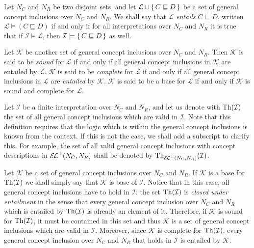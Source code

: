 \begin{Definition}
  \label{def:entailment-of-gcis}
  Let $N_C$ and $N_R$ be two disjoint sets, and let $\mathcal{L} \cup {\ensuremath{\{\, C \sqsubseteq
    D \,\}}}$ be a set of general concept inclusions over $N_C$ and $N_R$.  We shall say that
  $\mathcal{L}$ \emph{entails} $C \sqsubseteq D$, written $\mathcal{L} \models (C
  \sqsubseteq D)$ if and only if for all interpretations over $N_C$ and $N_R$ it is true
  that if $\mathcal{I} \models \mathcal{L}$, then $\mathcal{I} \models {\ensuremath{\{\, C \sqsubseteq
    D \,\}}}$ as well.

  Let $\mathcal{K}$ be another set of general concept inclusions over $N_C$ and $N_R$.
  Then $\mathcal{K}$ is said to be \emph{sound} for $\mathcal{L}$ if and only if all
  general concept inclusions in $\mathcal{K}$ are entailed by $\mathcal{L}$.
  $\mathcal{K}$ is said to be \emph{complete} for $\mathcal{L}$ if and only if all general
  concept inclusions in $\mathcal{L}$ are \emph{entailed} by $\mathcal{K}$.  $\mathcal{K}$
  is said to be a base for $\mathcal{L}$ if and only if $\mathcal{K}$ is sound and
  complete for $\mathcal{L}$.
\end{Definition}

Let $\mathcal{I}$ be a finite interpretation over $N_C$ and $N_R$, and let us denote with
$\operatorname{Th}(\mathcal{I})$ the set of all general concept inclusions which are valid in
$\mathcal{I}$.  Note that this definition requires that the logic which is within the
general concept inclusions is known from the context.  If this is not the case, we shall
add a subscript to clarify this.  For example, the set of all valid general concept
inclusions with concept descriptions in ${{\mathcal{E}\kern-.3ex\mathcal{L}}^\bot}(N_C, N_R)$ shall be denoted by
$\operatorname{Th}_{{{\mathcal{E}\kern-.3ex\mathcal{L}}^\bot}(N_C, N_R)}(\mathcal{I})$.

Let $\mathcal{K}$ be a set of general concept inclusions over $N_C$ and $N_R$.  If
$\mathcal{K}$ is a base for $\operatorname{Th}(\mathcal{I})$ we shall simply say that $\mathcal{K}$ is
base of $\mathcal{I}$.  Notice that in this case, all general concept inclusions have to
hold in $\mathcal{I}$: the set $\operatorname{Th}(\mathcal{I})$ is \emph{closed under entailment} in the
sense that every general concept inclusion over $N_C$ and $N_R$ which is entailed by
$\operatorname{Th}(\mathcal{I})$ is already an element of it.  Therefore, if $\mathcal{K}$ is sound for
$\operatorname{Th}(\mathcal{I})$, it must be contained in this set and thus $\mathcal{K}$ is a set of
general concept inclusions which are valid in $\mathcal{I}$.  Moreover, since
$\mathcal{K}$ is complete for $\operatorname{Th}(\mathcal{I})$, every general concept inclusion over
$N_C$ and $N_R$ that holds in $\mathcal{I}$ is entailed by $\mathcal{K}$.

